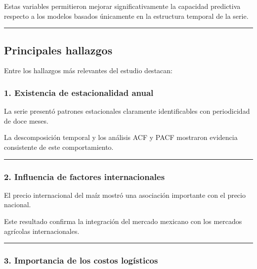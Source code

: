 \documentclass[11pt]{article}
\begin{document}
Estas variables permitieron mejorar significativamente la capacidad
predictiva respecto a los modelos basados únicamente en la estructura
temporal de la serie.

\begin{center}\rule{0.5\linewidth}{0.5pt}\end{center}

\hypertarget{principales-hallazgos}{%
\subsection{Principales hallazgos}\label{principales-hallazgos}}

Entre los hallazgos más relevantes del estudio destacan:

\hypertarget{existencia-de-estacionalidad-anual}{%
\subsubsection{1. Existencia de estacionalidad
anual}\label{existencia-de-estacionalidad-anual}}

La serie presentó patrones estacionales claramente identificables con
periodicidad de doce meses.

La descomposición temporal y los análisis ACF y PACF mostraron evidencia
consistente de este comportamiento.

\begin{center}\rule{0.5\linewidth}{0.5pt}\end{center}

\hypertarget{influencia-de-factores-internacionales}{%
\subsubsection{2. Influencia de factores
internacionales}\label{influencia-de-factores-internacionales}}

El precio internacional del maíz mostró una asociación importante con el
precio nacional.

Este resultado confirma la integración del mercado mexicano con los
mercados agrícolas internacionales.

\begin{center}\rule{0.5\linewidth}{0.5pt}\end{center}

\hypertarget{importancia-de-los-costos-loguxedsticos}{%
\subsubsection{3. Importancia de los costos
logísticos}\label{importancia-de-los-costos-loguxedsticos}}
\end{document}
